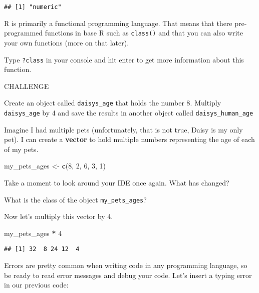 \documentclass[]{book}
\newenvironment{Shaded}{\begin{snugshade}}{\end{snugshade}}
\newcommand{\DecValTok}[1]{\textcolor[rgb]{0.00,0.00,0.81}{#1}}
\newcommand{\KeywordTok}[1]{\textcolor[rgb]{0.13,0.29,0.53}{\textbf{#1}}}
\newcommand{\NormalTok}[1]{#1}
\newcommand{\OperatorTok}[1]{\textcolor[rgb]{0.81,0.36,0.00}{\textbf{#1}}}
\newcommand{\StringTok}[1]{\textcolor[rgb]{0.31,0.60,0.02}{#1}}
\begin{document}
\begin{verbatim}
## [1] "numeric"
\end{verbatim}

R is primarily a functional programming language. That means that there pre-programmed functions in base R such as \texttt{class()} and that you can also write your own functions (more on that later).

Type \texttt{?class} in your console and hit enter to get more information about this function.

\leavevmode\hypertarget{challenge}{}%
CHALLENGE

Create an object called \texttt{daisys\_age} that holds the number 8.
Multiply \texttt{daisys\_age} by 4 and save the results in another object called \texttt{daisys\_human\_age}

Imagine I had multiple pets (unfortunately, that is not true, Daisy is my only pet). I can create a \textbf{vector} to hold multiple numbers representing the age of each of my pets.

\begin{Shaded}
\begin{Highlighting}[]
\NormalTok{my_pets_ages <-}\StringTok{ }\KeywordTok{c}\NormalTok{(}\DecValTok{8}\NormalTok{, }\DecValTok{2}\NormalTok{, }\DecValTok{6}\NormalTok{, }\DecValTok{3}\NormalTok{, }\DecValTok{1}\NormalTok{)}
\end{Highlighting}
\end{Shaded}

\leavevmode\hypertarget{question}{}%
Take a moment to look around your IDE once again. What has changed?

What is the class of the object \texttt{my\_pets\_ages}?

Now let's multiply this vector by 4.

\begin{Shaded}
\begin{Highlighting}[]
\NormalTok{my_pets_ages }\OperatorTok{*}\StringTok{ }\DecValTok{4}
\end{Highlighting}
\end{Shaded}

\begin{verbatim}
## [1] 32  8 24 12  4
\end{verbatim}

Errors are pretty common when writing code in any programming language, so be ready to read error messages and debug your code. Let's insert a typing error in our previous code:
\end{document}
